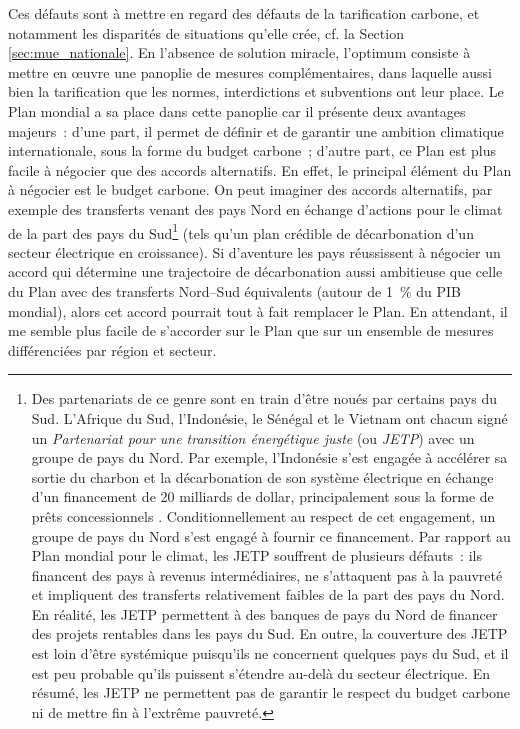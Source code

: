 \documentclass[a5paper,french,openany]{memoir}
\begin{document}
Ces défauts sont à mettre en regard des défauts de la tarification carbone, et notamment les disparités de situations qu'elle crée, cf. la Section \ref{sec:mue_nationale}. En l'absence de solution miracle, l'optimum consiste à mettre en œuvre une panoplie de mesures complémentaires, dans laquelle aussi bien la tarification que les normes, interdictions et subventions ont leur place. Le Plan mondial a sa place dans cette panoplie car il présente deux avantages majeurs~: d'une part, il permet de définir et de garantir une ambition climatique internationale, sous la forme du budget carbone~; d'autre part, ce Plan est plus facile à négocier que des accords alternatifs. En effet, le principal élément du Plan à négocier est le budget carbone. On peut imaginer des accords alternatifs, par exemple des transferts venant des pays Nord en échange d'actions pour le climat de la part des pays du Sud\footnote{Des partenariats de ce genre sont en train d'être noués par certains pays du Sud. L'Afrique du Sud, l'Indonésie, le Sénégal et le Vietnam ont chacun signé un \textit{Partenariat pour une transition énergétique juste} (ou \textit{JETP}) avec un groupe de pays du Nord. Par exemple, l'Indonésie s'est engagée à accélérer sa sortie du charbon et la décarbonation de son système électrique en échange d'un financement de 20 milliards de dollar, principalement sous la forme de prêts concessionnels \citep{ha-duong_just_2023}. Conditionnellement au respect de cet engagement, un groupe de pays du Nord s'est engagé à fournir ce financement. Par rapport au Plan mondial pour le climat, les JETP souffrent de plusieurs défauts~: ils financent des pays à revenus intermédiaires, ne s'attaquent pas à la pauvreté et impliquent des transferts relativement faibles de la part des pays du Nord. En réalité, les JETP permettent à des banques de pays du Nord de financer des projets rentables dans les pays du Sud. En outre, la couverture des JETP est loin d'être systémique puisqu'ils ne concernent quelques pays du Sud, et il est peu probable qu'ils puissent s'étendre au-delà du secteur électrique. En résumé, les JETP ne permettent pas de garantir le respect du budget carbone ni de mettre fin à l'extrême pauvreté.} 
(tels qu'un plan crédible de décarbonation d'un secteur électrique en croissance). Si d'aventure les pays réussissent à négocier un accord qui détermine une trajectoire de décarbonation aussi ambitieuse que celle du Plan avec des transferts Nord--Sud équivalents (autour de 1~\% du PIB mondial), alors cet accord pourrait tout à fait remplacer le Plan. En attendant, il me semble plus facile de s'accorder sur le Plan que sur un ensemble de mesures différenciées par région et secteur.
\end{document}
